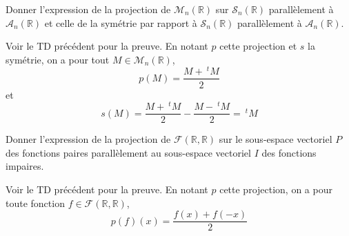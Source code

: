 \documentclass[a4paper,10pt]{report}
\begin{document}
\begin{Exercice}{} Donner l'expression de la projection de $\mathcal{M}_n(\mathbb{R})$ sur $\mathcal{S}_n(\mathbb{R})$ parallèlement à $\mathcal{A}_n(\mathbb{R})$ et celle de la symétrie par rapport à $\mathcal{S}_n(\mathbb{R})$ parallèlement à $\mathcal{A}_n(\mathbb{R})$.
\end{Exercice}

\corr Voir le TD précédent pour la preuve. En notant $p$ cette projection et $s$ la symétrie, on a pour tout $M \in \mathcal{M}_n(\mathbb{R})$, 
$$ p(M) = \dfrac{M+ ~^t M}{2}$$
et 
$$ s(M) =  \dfrac{M+ ~^t M}{2} -  \dfrac{M- ~^t M}{2} =~^t M$$



\begin{Exercice}{} Donner l'expression de la projection de $\mathcal{F}(\mathbb{R}, \mathbb{R})$ sur le sous-espace vectoriel $P$ des fonctions paires parallèlement au sous-espace vectoriel $I$ des fonctions impaires.
\end{Exercice}

\corr Voir le TD précédent pour la preuve. En notant $p$ cette projection, on a pour toute fonction $f \in \mathcal{F}(\mathbb{R}, \mathbb{R})$,
$$ p(f)(x) = \dfrac{f(x)+f(-x)}{2}$$




%
%
%
%
%
%
%
%
\end{document}
